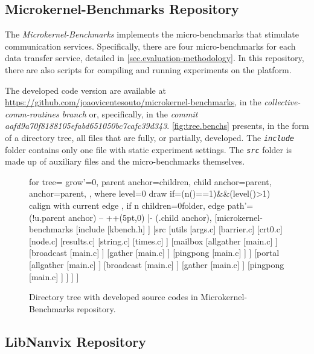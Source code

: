 	\subsection{Microkernel-Benchmarks Repository}

		The \textit{Microkernel-Benchmarks} implements the micro-benchmarks
		that stimulate communication services. Specifically, there are four
		micro-benchmarks for each data transfer service, detailed in
		\autoref{sec.evaluation-methodology}. In this repository, there
		are also scripts for compiling and running experiments on the
		\mppa platform.

		The developed code version are available at
		\url{https://github.com/joaovicentesouto/microkernel-benchmarks},
		in the \textit{collective-comm-routines branch} or, specifically,
		in the \textit{commit aafd9a70f8188105efabd651050bc7cafc39d343}.
		\autoref{fig:tree.benchs} presents, in the form of a directory
		tree, all files that are fully, or partially, developed. The
		\textit{\texttt{include}} folder contains only one file with static
		experiment settings. The \textit{\texttt{src}} folder is made up of
		auxiliary files and the micro-benchmarks themselves.

		\begin{figure}[!ht]
			\centering%
			\caption{Directory tree with developed source codes in Microkernel-Benchmarks repository.}%
			\label{fig:tree.benchs}%
			\begin{forest}
			for tree={
				grow'=0,
				parent anchor=children,
				child anchor=parent,
				anchor=parent,
			},
			where level=0{
				draw
			}{
				if={(n()==1)&&(level()>1)}{
				calign with current edge
				}{},
				if n children=0{folder}{},
				edge path'={(!u.parent anchor) -- ++(5pt,0) |- (.child anchor)},
			}
			[microkernel-benchmarks
				[include
					[kbench.h]
				]
				[src
					[utils
						[args.c]
						[barrier.c]
						[crt0.c]
						[node.c]
						[results.c]
						[string.c]
						[times.c]
					]
					[mailbox
						[allgather
							[main.c]
						]
						[broadcast
							[main.c]
						]
						[gather
							[main.c]
						]
						[pingpong
							[main.c]
						]
					]
					[portal
						[allgather
							[main.c]
						]
						[broadcast
							[main.c]
						]
						[gather
							[main.c]
						]
						[pingpong
							[main.c]
						]
					]
				]
			]
			\end{forest}%
		\end{figure}

	\subsection{LibNanvix Repository}

